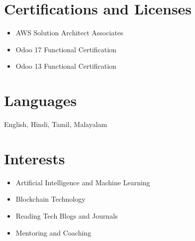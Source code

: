 \documentclass[a4paper,10pt]{article}
\begin{document}
\vspace{5mm}

\section*{\textcolor{primary}{Certifications and Licenses}}
\begin{itemize}[left=0pt, label=$\bullet$]
    \item AWS Solution Architect Associates
    \item Odoo 17 Functional Certification
    \item Odoo 13 Functional Certification
\end{itemize}

\vspace{5mm}

\section*{\textcolor{primary}{Languages}}
English, Hindi, Tamil, Malayalam

\vspace{5mm}



\section*{\textcolor{primary}{Interests}}
\begin{itemize}[left=0pt, label=$\vcenter{\hbox{\tiny$\bullet$}}$]
    \item Artificial Intelligence and Machine Learning
    \item Blockchain Technology
    \item Reading Tech Blogs and Journals
    \item Mentoring and Coaching
\end{itemize}
\end{document}
